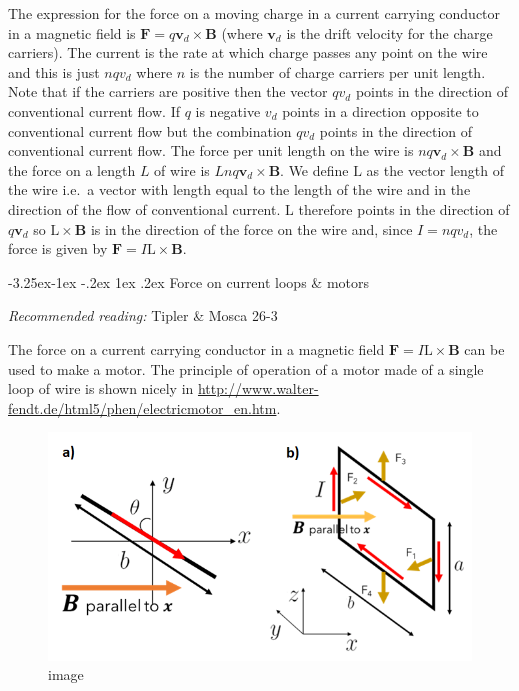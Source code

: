 \documentclass[
]{book}
\makeatletter
\renewcommand\subsection{%
\@startsection{subsection}{2}{\z@}%
              {-3.25ex\@plus -1ex \@minus -.2ex}%
              {1ex \@plus .2ex}%
              {\sffamily\bfseries}}
\numberwithin{equation}{section}
\makeatother
\begin{document}
The expression for the force on a moving charge in a current carrying
conductor in a magnetic field is \(\mathbf{F} = q\mathbf{v}_d \times \mathbf{B}\) (where \(\mathbf{v}_d\) is
the drift velocity for the charge carriers). The current is the rate at
which charge passes any point on the wire and this is just \(nqv_d\) where
\(n\) is the number of charge carriers per unit length. Note that if the
carriers are positive then the vector \(qv_d\) points in the direction of
conventional current flow. If \(q\) is negative \(v_d\) points in a
direction opposite to conventional current flow but the combination
\(qv_d\) points in the direction of conventional current flow. The force
per unit length on the wire is \(nq \mathbf{v}_d \times \mathbf{B}\) and the force on a
length \(L\) of wire is \(Lnq \mathbf{v}_d \times \mathbf{B}\). We define \(\mathrm{L}\) as the vector
length of the wire i.e.~a vector with length equal to the length of the
wire and in the direction of the flow of conventional current. \(\mathrm{L}\)
therefore points in the direction of \(q \mathbf{v}_d\) so \(\mathrm{L} \times \mathbf{B}\) is in
the direction of the force on the wire and, since \(I = nq v_d\), the
force is given by \(\mathbf{F} = I \mathrm{L} \times \mathbf{B}\).

\hypertarget{force-on-current-loops-motors}{%
\subsection{Force on current loops \& motors}\label{force-on-current-loops-motors}}

\emph{Recommended reading:} Tipler \& Mosca 26-3

The force on a current carrying conductor in a magnetic field
\(\mathbf{F} = I \mathrm{L} \times \mathbf{B}\) can be used to make a motor. The principle of
operation of a motor made of a single loop of wire is shown nicely in
\url{http://www.walter-fendt.de/html5/phen/electricmotor_en.htm}.

\begin{figure}
\centering
\includegraphics[width=120mm,height=\textheight]{Figures/motor_pics.png}
\caption{image}
\end{figure}
\end{document}
